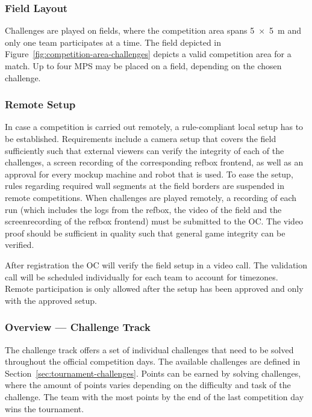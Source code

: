 \documentclass[12pt,twoside]{article}
\newcommand{\refsec}[1]{Section~\ref{#1}}
\newcommand{\reffig}[1]{Figure~\ref{#1}}
\begin{document}
\subsubsection{Field Layout}
Challenges are played on fields, where the competition area spans
\SI{5 x 5}{\metre} and only one team participates at a time. %
The field depicted in \reffig{fig:competition-area-challenges} depicts a valid
competition area for a match.
Up to four \ac{MPS} may be placed on a field, depending on the chosen challenge.

\subsubsection{Remote Setup}
In case a competition is carried out remotely, a rule-compliant local setup
has to be established.
Requirements include a camera setup that covers the field sufficiently
such that external viewers can verify the integrity of each of the challenges,
a screen recording of the corresponding refbox frontend,
as well as an approval for every mockup machine and robot that is used.
To ease the setup, rules regarding required wall segments at the field borders
are suspended in remote competitions.
When challenges are played remotely, a recording of each run (which includes
the logs from the refbox, the video of the field and the screenrecording of
the refbox frontend) must be submitted to the \ac{OC}. The video proof should
be sufficient in quality such that general game integrity can be verified.

After registration the \ac{OC} will verify the field setup in a video call.
The validation call will be scheduled individually for each team
to account for timezones. Remote participation is only allowed after the setup
has been approved and only with the approved setup.



\subsubsection{Overview --- Challenge Track}
The challenge track offers a set of individual challenges that need to be solved
throughout the official competition days.
The available challenges are defined in \refsec{sec:tournament-challenges}.
Points can be earned by solving challenges, where the amount of points varies
depending on the difficulty and task of the challenge.
The team with the most points by the end of the last competition day wins
the tournament.
\end{document}
